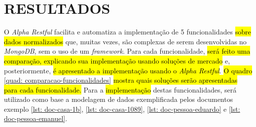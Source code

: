 \chapter{RESULTADOS}
\label{Resultados}

O \textit{Alpha Restful} facilita e automatiza a implementação de 5 funcionalidades \hl{sobre dados normalizados} que,
muitas vezes,
são complexas de serem desenvolvidas no \textit{MongoDB}, sem o uso de um \textit{framework}. Para cada funcionalidade, \hl{será feito uma comparação, explicando sua implementação usando soluções de mercado} e, posteriormente, \hl{é apresentado a implementação usando o \textit{Alpha Restful}}. \hl{O quadro} \ref{quad: comparacao-funcionalidades} \hl{mostra quais soluções serão apresentadas para cada funcionalidade.} Para a \hl{implementação} destas funcionalidades, será utilizado como base a modelagem de dados exemplificada pelos documentos exemplo \ref{lst: doc-casa-1b}, \ref{lst: doc-casa-1089}, \ref{lst: doc-pessoa-eduardo} e \ref{lst: doc-pessoa-emanuel}.

